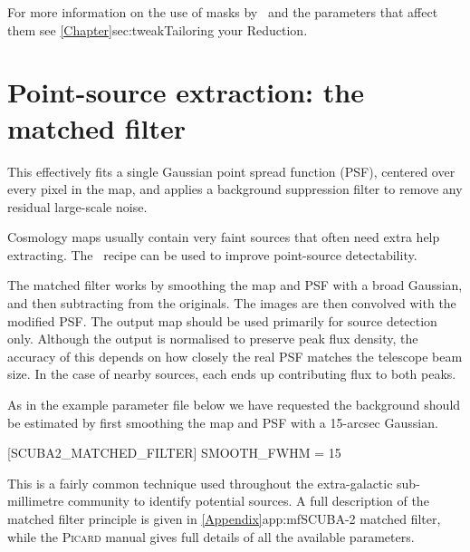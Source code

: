 \documentclass[11pt,oneside,chapters]{starlink}
\begin{document}
For more information on the use of masks by \makemap\ and the
parameters that affect them see \cref{Chapter}{sec:tweak}{Tailoring
your Reduction}.



\section{Point-source extraction: the matched filter}
\label{sec:mf}

This effectively fits a single Gaussian point spread function (PSF), centered over
every pixel in the map, and applies a background suppression filter to
remove any residual large-scale noise.

Cosmology maps usually contain very faint sources that often need
extra help extracting. The \picard\ recipe
can be used to improve point-source detectability.

The matched filter works by smoothing the map and PSF with a broad
Gaussian, and then subtracting from the originals. The images are then
convolved with the modified PSF. The output map should be used
primarily for source detection only. Although the output is normalised
to preserve peak flux density, the accuracy of this depends on how
closely the real PSF matches the telescope beam size. In the case of
nearby sources, each ends up contributing flux to both peaks.

\begin{terminalv}
\end{terminalv}

As in the example parameter file below we have requested the
background should be estimated by first smoothing the map and PSF with
a 15-arcsec Gaussian.

\begin{terminalv}

[SCUBA2_MATCHED_FILTER]
SMOOTH_FWHM = 15

\end{terminalv}

\latex{\vspace{4mm}}

This is a fairly common technique used throughout the extra-galactic
sub-millimetre community to identify potential sources. A full
description of the matched filter principle is given in
\cref{Appendix}{app:mf}{SCUBA-2 matched filter}, while the \textsc{Picard}
manual gives full details of all the available parameters.
\end{document}
